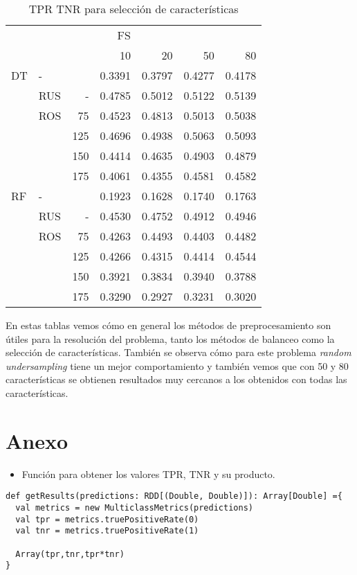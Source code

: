 \documentclass[11pt]{article}
\begin{document}
\begin{table}[htbp]
\caption{\label{tab:orga77615f}
TPR \texttimes{} TNR para selección de características}
\centering
\begin{tabular}{|llr|rrrr|}
\hline
 &  &  & FS &  &  & \\
 &  &  & 10 & 20 & 50 & 80\\
\hline
DT & - &  & 0.3391 & 0.3797 & 0.4277 & 0.4178\\
 & RUS & - & 0.4785 & 0.5012 & 0.5122 & 0.5139\\
 & ROS & 75 & 0.4523 & 0.4813 & 0.5013 & 0.5038\\
 &  & 125 & 0.4696 & 0.4938 & 0.5063 & 0.5093\\
 &  & 150 & 0.4414 & 0.4635 & 0.4903 & 0.4879\\
 &  & 175 & 0.4061 & 0.4355 & 0.4581 & 0.4582\\
\hline
RF & - &  & 0.1923 & 0.1628 & 0.1740 & 0.1763\\
 & RUS & - & 0.4530 & 0.4752 & 0.4912 & 0.4946\\
 & ROS & 75 & 0.4263 & 0.4493 & 0.4403 & 0.4482\\
 &  & 125 & 0.4266 & 0.4315 & 0.4414 & 0.4544\\
 &  & 150 & 0.3921 & 0.3834 & 0.3940 & 0.3788\\
 &  & 175 & 0.3290 & 0.2927 & 0.3231 & 0.3020\\
\hline
\end{tabular}
\end{table}

En estas tablas vemos cómo en general los métodos de preprocesamiento
son útiles para la resolución del problema, tanto los métodos de
balanceo como la selección de características. También se observa cómo
para este problema \emph{random undersampling} tiene un mejor
comportamiento y también vemos que con 50 y 80 características se
obtienen resultados muy cercanos a los obtenidos con todas las
características.

\section{Anexo}
\label{sec:org17359bb}

\begin{itemize}
\item Función para obtener los valores TPR, TNR y su producto.
\end{itemize}

\begin{verbatim}
def getResults(predictions: RDD[(Double, Double)]): Array[Double] ={
  val metrics = new MulticlassMetrics(predictions)
  val tpr = metrics.truePositiveRate(0)
  val tnr = metrics.truePositiveRate(1)
  
  Array(tpr,tnr,tpr*tnr)
}
\end{verbatim}
\end{document}
